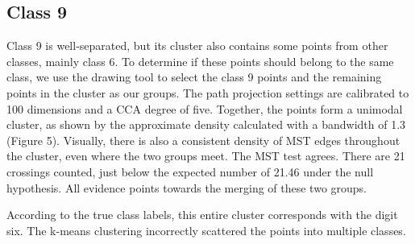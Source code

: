 \documentclass{article}
\begin{document}
\subsection{Class 9}
Class 9 is well-separated, but its cluster also contains some points from other classes, mainly class 6. To determine if these points should belong to the same class, we use the drawing tool to select the class 9 points and the remaining points in the cluster as our groups. The path projection settings are calibrated to 100 dimensions and a CCA degree of five. Together, the points form a unimodal cluster, as shown by the approximate density calculated with a bandwidth of 1.3 (Figure 5). Visually, there is also a consistent density of MST edges throughout the cluster, even where the two groups meet. The MST test agrees. There are 21 crossings counted, just below the expected number of 21.46 under the null hypothesis. All evidence points towards the merging of these two groups.

According to the true class labels, this entire cluster corresponds with the digit six. The k-means clustering incorrectly scattered the points into multiple classes.

\newpage
\end{document}
